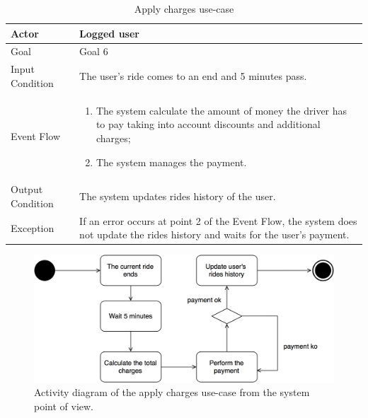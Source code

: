 \begin{table}[H]
\begin{center}
\begin{tabular}{p{} | p{}}
\hline
Actor & Logged user\\
\hline
Goal & Goal 6\\
\hline
Input Condition & The user's ride comes to an end and 5 minutes pass.\\
\hline
Event Flow & 
\begin{enumerate}
\item The system calculate the amount of money the driver has to pay taking into account discounts and additional charges;
\item The system manages the payment.
\end{enumerate} \\
\hline
Output Condition & The system updates rides history of the user.\\
\hline
Exception & If an error occurs at point 2 of the Event Flow, the system does not update the rides history and waits for the user's payment.\\
\hline
\end{tabular}
\end{center}
\caption{Apply charges use-case}
\label{apply_charges_uc}
\end{table}

\begin{figure}[H]
\begin{center}
		\includegraphics[width=\textwidth]{./specific_requirements/features/diagrams/apply_charges_activity.png}
		\caption{Activity diagram of the apply charges use-case from the system point of view.}
		\label{app_charges_act}
\end{center}
\end{figure}